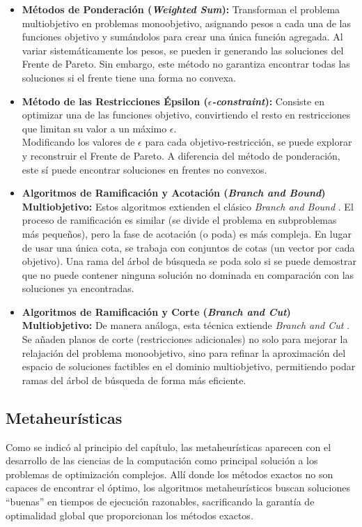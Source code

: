 \documentclass[12pt,a4paper]{book}
\begin{document}
\begin{itemize}
    \item \textbf{Métodos de Ponderación (\textit{Weighted Sum}):} Transforman el problema multiobjetivo en problemas monoobjetivo, asignando pesos a cada una de las funciones objetivo y sumándolos para crear una única función agregada. Al variar sistemáticamente los pesos, se pueden ir generando las soluciones del Frente de Pareto. Sin embargo, este método no garantiza encontrar todas las soluciones si el frente tiene una forma no convexa.

    \item \textbf{Método de las Restricciones Épsilon (\textit{$\epsilon$-constraint}):} Consiste en optimizar una de las funciones objetivo, convirtiendo el resto en restricciones que limitan su valor a un máximo $\epsilon$.\\
    Modificando los valores de $\epsilon$ para cada objetivo-restricción, se puede explorar y reconstruir el Frente de Pareto. A diferencia del método de ponderación, este sí puede encontrar soluciones en frentes no convexos.

    \item \textbf{Algoritmos de Ramificación y Acotación (\textit{Branch and Bound}) Multiobjetivo:} Estos algoritmos extienden el clásico \textit{Branch and Bound} \citep{bnb}. El proceso de ramificación es similar (se divide el problema en subproblemas más pequeños), pero la fase de acotación (o poda) es más compleja. En lugar de usar una única cota, se trabaja con conjuntos de cotas (un vector por cada objetivo). Una rama del árbol de búsqueda se poda solo si se puede demostrar que no puede contener ninguna solución no dominada en comparación con las soluciones ya encontradas.

    \item \textbf{Algoritmos de Ramificación y Corte (\textit{Branch and Cut}) Multiobjetivo:} De manera análoga, esta técnica extiende \textit{Branch and Cut} \citep{bnc}. Se añaden planos de corte (restricciones adicionales) no solo para mejorar la relajación del problema monoobjetivo, sino para refinar la aproximación del espacio de soluciones factibles en el dominio multiobjetivo, permitiendo podar ramas del árbol de búsqueda de forma más eficiente.
\end{itemize}

\subsection{Metaheurísticas}
Como se indicó al principio del capítulo, las metaheurísticas \citep{metaheuristicos} aparecen con el desarrollo de las ciencias de la computación como principal solución a los problemas de optimización complejos. Allí donde los métodos exactos no son capaces de encontrar el óptimo,
los algoritmos metaheurísticos buscan soluciones ``buenas'' en tiempos de ejecución razonables, sacrificando la garantía de optimalidad global que proporcionan los métodos exactos.
\end{document}
